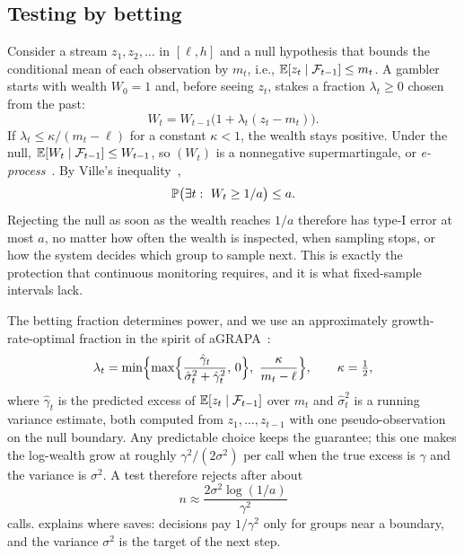 \subsection{Testing by betting}
\label{sec:betting}

Consider a stream $z_1,z_2,\dots$ in $[\ell,h]$ and a null hypothesis that bounds the conditional mean of each observation by $m_t$, i.e., $\mathbb{E}[z_t\mid\mathcal{F}_{t-1}]\le m_t$.
A gambler starts with wealth $W_0=1$ and, before seeing $z_t$, stakes a fraction $\lambda_t\ge 0$ chosen from the past:
\begin{equation}
W_t=W_{t-1}\bigl(1+\lambda_t(z_t-m_t)\bigr).
\label{eq:wealth}
\end{equation}
If $\lambda_t\le\kappa/(m_t-\ell)$ for a constant $\kappa<1$, the wealth stays positive.
Under the null, $\mathbb{E}[W_t\mid\mathcal{F}_{t-1}]\le W_{t-1}$, so $(W_t)$ is a nonnegative supermartingale, or \emph{e-process}~\cite{ramdas2023savi,shafer2021}.
By Ville's inequality~\cite{ville1939},
\begin{equation}
\mathbb{P}\bigl(\exists t:\ W_t\ge 1/a\bigr)\le a .
\label{eq:ville}
\end{equation}
Rejecting the null as soon as the wealth reaches $1/a$ therefore has type-I error at most $a$, no matter how often the wealth is inspected, when sampling stops, or how the system decides which group to sample next.
This is exactly the protection that continuous monitoring requires, and it is what fixed-sample intervals lack.

The betting fraction determines power, and we use an approximately growth-rate-optimal fraction in the spirit of aGRAPA~\cite{wsr2024betting}:
\begin{equation}
\lambda_t=\min\Bigl\{\max\Bigl\{\frac{\hat\gamma_{t}}{\hat\sigma^2_{t}+\hat\gamma_{t}^2},\,0\Bigr\},\ \frac{\kappa}{m_t-\ell}\Bigr\},\qquad \kappa=\tfrac12,
\label{eq:lambda}
\end{equation}
where $\hat\gamma_t$ is the predicted excess of $\mathbb{E}[z_t\mid\mathcal{F}_{t-1}]$ over $m_t$ and $\hat\sigma^2_t$ is a running variance estimate, both computed from $z_1,\dots,z_{t-1}$ with one pseudo-observation on the null boundary.
Any predictable choice keeps the guarantee; this one makes the log-wealth grow at roughly $\gamma^2/(2\sigma^2)$ per call when the true excess is $\gamma$ and the variance is $\sigma^2$.
A test therefore rejects after about
\begin{equation}
n\approx\frac{2\sigma^2\log(1/a)}{\gamma^2}
\label{eq:cost}
\end{equation}
calls.
 explains where \sys{} saves: decisions pay $1/\gamma^2$ only for groups near a boundary, and the variance $\sigma^2$ is the target of the next step.

